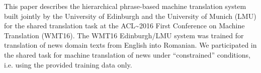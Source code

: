 This paper describes the hierarchical phrase-based machine translation system built jointly by the University of Edinburgh and the University of Munich (LMU) for the shared translation task at the ACL{\textasciitilde}2016 First Conference on Machine Translation (WMT16). The WMT16 Edinburgh/LMU system was trained for translation of news domain texts from English into Romanian. We participated in the shared task for machine translation of news under ``constrained'' conditions, i.e. using the provided training data only.
